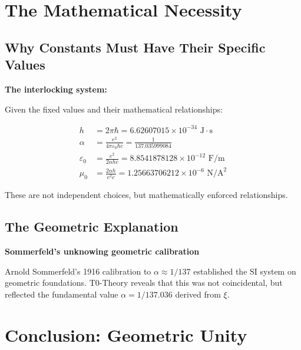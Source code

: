 \documentclass[12pt,a4paper]{article}
\begin{document}
	\section{The Mathematical Necessity}
	
	\subsection{Why Constants Must Have Their Specific Values}
	
	\begin{derivation}
		\textbf{The interlocking system:}
		
		Given the fixed values and their mathematical relationships:
		
		\begin{align}
			h &= 2\pi\hbar = 6.62607015 \times 10^{-34} \text{ J}\cdot\text{s} \\
			\alpha &= \frac{e^2}{4\pi\varepsilon_0\hbar c} = \frac{1}{137.035999084} \\
			\varepsilon_0 &= \frac{e^2}{2\alpha h c} = 8.8541878128 \times 10^{-12} \text{ F/m} \\
			\mu_0 &= \frac{2\alpha h}{e^2 c} = 1.25663706212 \times 10^{-6} \text{ N/A}^2
		\end{align}
		
		These are not independent choices, but mathematically enforced relationships.
	\end{derivation}
	
	\subsection{The Geometric Explanation}
	
	\begin{historical}
		\textbf{Sommerfeld's unknowing geometric calibration}
		
		Arnold Sommerfeld's 1916 calibration to $\alpha \approx 1/137$ established the SI system on geometric foundations. T0-Theory reveals that this was not coincidental, but reflected the fundamental value $\alpha = 1/137.036$ derived from $\xi$.
	\end{historical}
	
	\section{Conclusion: Geometric Unity}
	
\end{document}
